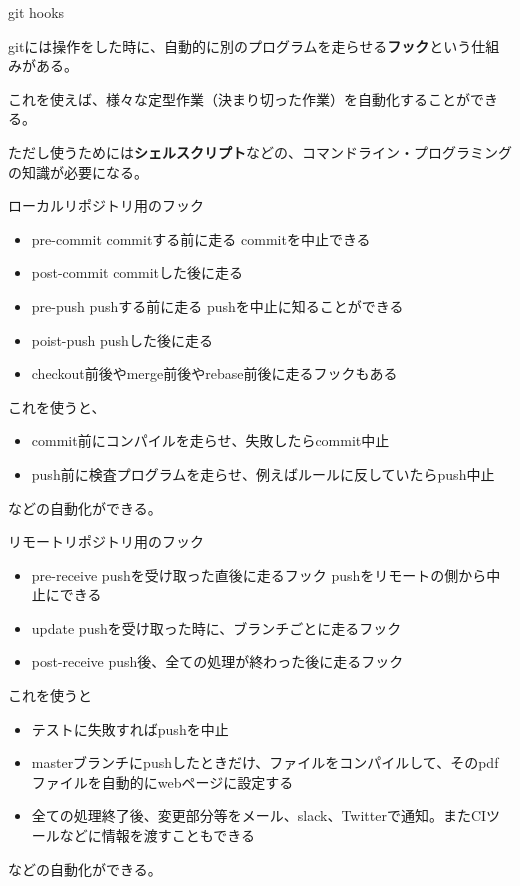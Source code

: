 \documentclass[12pt, unicode]{beamer}
\begin{document}
\begin{frame}{git hooks}

gitには操作をした時に、自動的に別のプログラムを走らせる\textbf{フック}という仕組みがある。

これを使えば、様々な定型作業（決まり切った作業）を自動化することができる。

ただし使うためには\textbf{シェルスクリプト}などの、コマンドライン・プログラミングの知識が必要になる。

\end{frame}

\begin{frame}{ローカルリポジトリ用のフック}
\begin{itemize}
\item pre-commit commitする前に走る commitを中止できる
\item post-commit commitした後に走る
\item pre-push pushする前に走る pushを中止に知ることができる
\item poist-push pushした後に走る
\item checkout前後やmerge前後やrebase前後に走るフックもある
\end{itemize}

これを使うと、

\begin{itemize}
\item commit前にコンパイルを走らせ、失敗したらcommit中止
\item push前に検査プログラムを走らせ、例えばルールに反していたらpush中止
\end{itemize}

などの自動化ができる。

\end{frame}
\begin{frame}{リモートリポジトリ用のフック}
\begin{itemize}
\item pre-receive pushを受け取った直後に走るフック pushをリモートの側から中止にできる
\item update pushを受け取った時に、ブランチごとに走るフック
\item post-receive push後、全ての処理が終わった後に走るフック
\end{itemize}

これを使うと

\begin{itemize}
\item テストに失敗すればpushを中止
\item masterブランチにpushしたときだけ、ファイルをコンパイルして、そのpdfファイルを自動的にwebページに設定する
\item 全ての処理終了後、変更部分等をメール、slack、Twitterで通知。またCIツールなどに情報を渡すこともできる
\end{itemize}

などの自動化ができる。

\end{frame}
\end{document}
